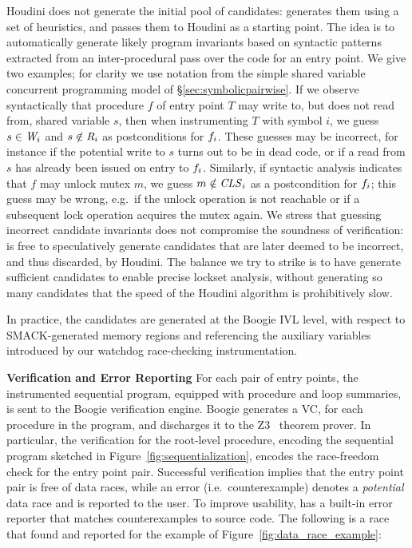Houdini does not generate the initial pool of candidates: \whoop generates them using a set of heuristics, and passes them to Houdini as a starting point.  The idea is to automatically generate likely program invariants based on syntactic patterns extracted from an inter-procedural pass over the code for an entry point.  We give two examples; for clarity we use notation from the simple shared variable concurrent programming model of \S\ref{sec:symbolicpairwise}.  If we observe syntactically that procedure $f$ of entry point $T$ may write to, but does not read from, shared variable $s$, then when instrumenting $T$ with symbol $i$, we guess $s \in \mathit{W}_{i}$ and $s \notin\mathit{R}_{i}$ as postconditions for $f_{i}$.  These guesses may be incorrect, for instance if the potential write to $s$ turns out to be in dead code, or if a read from $s$ has already been issued on entry to $f_{i}$.  Similarly, if syntactic analysis indicates that $f$ may unlock mutex $m$, we guess $m \notin \mathit{CLS}_{i}$ as a postcondition for $f_{i}$; this guess may be wrong, e.g.\ if the unlock operation is not reachable or if a subsequent lock operation acquires the mutex again.  We stress that guessing incorrect candidate invariants does not compromise the soundness of verification: \whoop is free to speculatively generate candidates that are later deemed to be incorrect, and thus discarded, by Houdini.  The balance we try to strike is to have \whoop generate sufficient candidates to enable precise lockset analysis, without generating so many candidates that the speed of the Houdini algorithm is prohibitively slow.

In practice, the candidates are generated at the Boogie IVL level, with respect to SMACK-generated memory regions and referencing the auxiliary variables introduced by our watchdog race-checking instrumentation.

\noindent\textbf{Verification and Error Reporting }
%
For each pair of entry points, the instrumented sequential program, equipped with procedure and loop summaries, is sent to the Boogie verification engine. Boogie generates a VC, for each procedure in the program, and discharges it to the Z3~\cite{de2008z3} theorem prover.  In particular, the verification for the root-level procedure, encoding the sequential program sketched in Figure~\ref{fig:sequentialization}, encodes the race-freedom check for the entry point pair. Successful verification implies that the entry point pair is free of data races, while an error (i.e.\ counterexample) denotes a \emph{potential} data race and is reported to the user. To improve usability, \whoop has a built-in error reporter that matches counterexamples to source code. The following is a race that \whoop found and reported for the example of Figure~\ref{fig:data_race_example}: 

